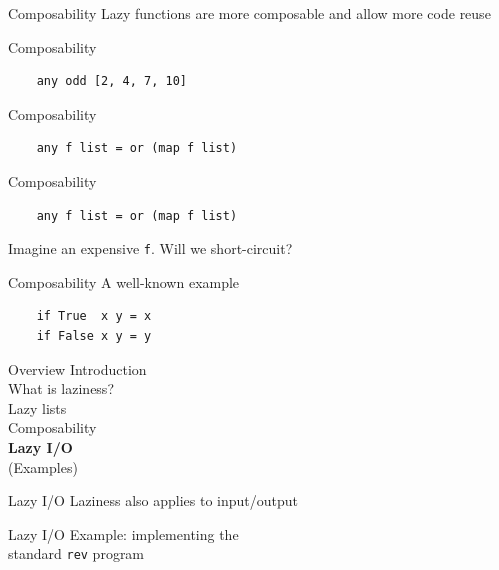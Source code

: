 \documentclass[20pt]{beamer}
\newcommand{\vspaced}{
    \vspace{5mm}
}
\begin{document}
\begin{frame}{Composability}
    Lazy functions are more composable and allow more code reuse
\end{frame}

\begin{frame}[fragile]{Composability}
    \begin{lstlisting}
    any odd [2, 4, 7, 10]
    \end{lstlisting}
\end{frame}

\begin{frame}[fragile]{Composability}
    \begin{lstlisting}
    any f list = or (map f list)
    \end{lstlisting}
\end{frame}

\begin{frame}[fragile]{Composability}
    \begin{lstlisting}
    any f list = or (map f list)
    \end{lstlisting}
    \vspaced
    Imagine an expensive \texttt{f}. Will we short-circuit?
\end{frame}

\begin{frame}[fragile]{Composability}
    A well-known example
    \vspaced
    \begin{lstlisting}
    if True  x y = x
    if False x y = y
    \end{lstlisting}
\end{frame}


\begin{frame}{Overview}
    Introduction \\
    What is laziness? \\
    Lazy lists \\
    Composability \\
    \textbf{Lazy I/O} \\
    (Examples)
\end{frame}

\begin{frame}{Lazy I/O}
    Laziness also applies to input/output
\end{frame}

\begin{frame}{Lazy I/O}
    Example: implementing the \\
    standard \texttt{rev} program
\end{frame}
\end{document}
